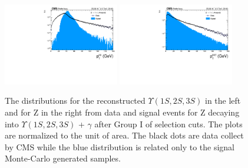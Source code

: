 \begin{figure}[!htbp]
\begin{center}
\includegraphics[width=0.45\textwidth]{figures_and_tables/outputPlots/ZtoUpsilon_Cat0_ZZZZZ/au/data_x_mc/noKinCuts/h_noKin_Upsilon_Pt}\hspace*{1.cm}
\includegraphics[width=0.45\textwidth]{figures_and_tables/outputPlots/ZtoUpsilon_Cat0_ZZZZZ/au/data_x_mc/noKinCuts/h_noKin_Z_Pt}
\end{center}\vspace*{-.5cm}
\caption{The \PT distributions for the reconstructed $\Upsilon(1S,2S,3S)$ in the left and for Z in the right from data and signal events for Z decaying into $\Upsilon(1S,2S,3S)$ + $\gamma$ after Group I of selection cuts. The plots are normalized to the unit of area. The black dots are data collect by CMS while the blue distribution is related only to the signal Monte-Carlo generated samples.}
\label{fig:pTUpsilon_and_Z_ZtoUpsilon_Cat0}
\end{figure}


